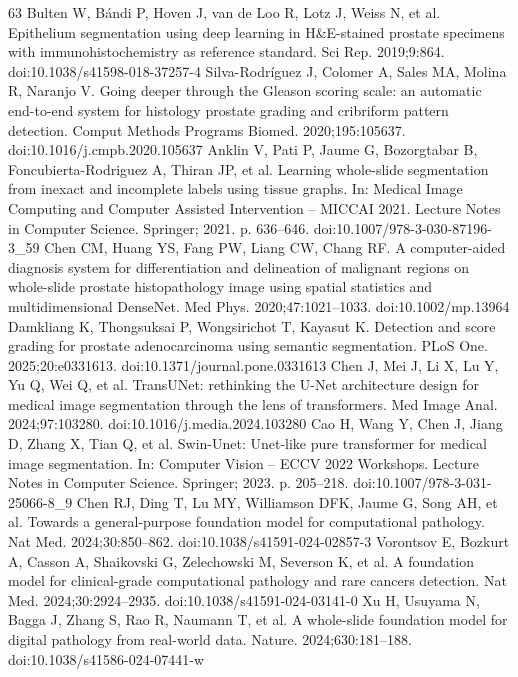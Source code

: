 \documentclass[10pt,letterpaper]{article}
\begin{document}
\begin{thebibliography}{63}
 Bulten W, B\'andi P, Hoven J, van de Loo R, Lotz J, Weiss N, et al. Epithelium segmentation using deep learning in H\&E-stained prostate specimens with immunohistochemistry as reference standard. Sci Rep. 2019;9:864. doi:10.1038/s41598-018-37257-4
 Silva-Rodr\'iguez J, Colomer A, Sales MA, Molina R, Naranjo V. Going deeper through the Gleason scoring scale: an automatic end-to-end system for histology prostate grading and cribriform pattern detection. Comput Methods Programs Biomed. 2020;195:105637. doi:10.1016/j.cmpb.2020.105637
 Anklin V, Pati P, Jaume G, Bozorgtabar B, Foncubierta-Rodriguez A, Thiran JP, et al. Learning whole-slide segmentation from inexact and incomplete labels using tissue graphs. In: Medical Image Computing and Computer Assisted Intervention -- MICCAI 2021. Lecture Notes in Computer Science. Springer; 2021. p. 636--646. doi:10.1007/978-3-030-87196-3\_59
 Chen CM, Huang YS, Fang PW, Liang CW, Chang RF. A computer-aided diagnosis system for differentiation and delineation of malignant regions on whole-slide prostate histopathology image using spatial statistics and multidimensional DenseNet. Med Phys. 2020;47:1021--1033. doi:10.1002/mp.13964
 Damkliang K, Thongsuksai P, Wongsirichot T, Kayasut K. Detection and score grading for prostate adenocarcinoma using semantic segmentation. PLoS One. 2025;20:e0331613. doi:10.1371/journal.pone.0331613
 Chen J, Mei J, Li X, Lu Y, Yu Q, Wei Q, et al. TransUNet: rethinking the U-Net architecture design for medical image segmentation through the lens of transformers. Med Image Anal. 2024;97:103280. doi:10.1016/j.media.2024.103280
 Cao H, Wang Y, Chen J, Jiang D, Zhang X, Tian Q, et al. Swin-Unet: Unet-like pure transformer for medical image segmentation. In: Computer Vision -- ECCV 2022 Workshops. Lecture Notes in Computer Science. Springer; 2023. p. 205--218. doi:10.1007/978-3-031-25066-8\_9
 Chen RJ, Ding T, Lu MY, Williamson DFK, Jaume G, Song AH, et al. Towards a general-purpose foundation model for computational pathology. Nat Med. 2024;30:850--862. doi:10.1038/s41591-024-02857-3
 Vorontsov E, Bozkurt A, Casson A, Shaikovski G, Zelechowski M, Severson K, et al. A foundation model for clinical-grade computational pathology and rare cancers detection. Nat Med. 2024;30:2924--2935. doi:10.1038/s41591-024-03141-0
 Xu H, Usuyama N, Bagga J, Zhang S, Rao R, Naumann T, et al. A whole-slide foundation model for digital pathology from real-world data. Nature. 2024;630:181--188. doi:10.1038/s41586-024-07441-w

\end{thebibliography}
\end{document}

